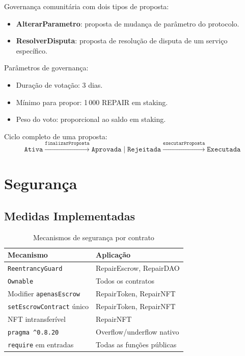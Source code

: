 \documentclass[
    12pt,
    a4paper,
    oneside,
    brazil,
    sumario=tradicional
]{abntex2}
\begin{document}
Governança comunitária com dois tipos de proposta:

\begin{itemize}
    \item \textbf{AlterarParametro}: proposta de mudança de parâmetro
    do protocolo.
    \item \textbf{ResolverDisputa}: proposta de resolução de disputa
    de um serviço específico.
\end{itemize}

Parâmetros de governança:
\begin{itemize}
    \item Duração de votação: 3 dias.
    \item Mínimo para propor: 1\,000 REPAIR em staking.
    \item Peso do voto: proporcional ao saldo em staking.
\end{itemize}

Ciclo completo de uma proposta:
\[
\texttt{Ativa}
\xrightarrow{\texttt{finalizarProposta}}
\texttt{Aprovada} \mid \texttt{Rejeitada}
\xrightarrow{\texttt{executarProposta}}
\texttt{Executada}
\]

\section{Segurança}

\subsection{Medidas Implementadas}

\begin{table}[h]
\caption{Mecanismos de segurança por contrato}
\label{tab:seguranca}
\begin{tabularx}{\textwidth}{@{}lX@{}}
\toprule
\textbf{Mecanismo} & \textbf{Aplicação} \\
\midrule
\texttt{ReentrancyGuard}      & RepairEscrow, RepairDAO \\
\texttt{Ownable}              & Todos os contratos \\
Modifier \texttt{apenasEscrow}& RepairToken, RepairNFT \\
\texttt{setEscrowContract} único & RepairToken, RepairNFT \\
NFT intransferível            & RepairNFT \\
\texttt{pragma \^{}0.8.20}   & Overflow/underflow nativo \\
\texttt{require} em entradas  & Todas as funções públicas \\
\bottomrule
\end{tabularx}
\end{table}
\end{document}
